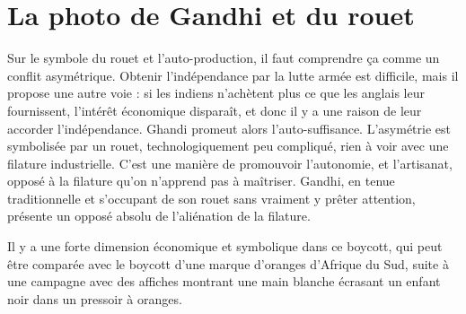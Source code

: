 \documentclass[a4paper,12pt]{book}
\begin{document}
\section{La photo de Gandhi et du rouet}
Sur le symbole du rouet et l'auto-production, il faut comprendre ça comme un conflit asymétrique. Obtenir l'indépendance par la lutte armée est difficile, mais il propose une autre voie : si les indiens n'achètent plus ce que les anglais leur fournissent, l'intérêt économique disparaît, et donc il y a une raison de leur accorder l'indépendance. Ghandi promeut alors l'auto-suffisance. L'asymétrie est symbolisée par un rouet, technologiquement peu compliqué, rien à voir avec une filature industrielle. C'est une manière de promouvoir l'autonomie, et l'artisanat, opposé à la filature qu'on n'apprend pas à maîtriser. Gandhi, en tenue traditionnelle et s'occupant de son rouet sans vraiment y prêter attention, présente un opposé absolu de l'aliénation de la filature.
\par Il y a une forte dimension économique et symbolique dans ce boycott, qui peut être comparée avec le boycott d'une marque d'oranges d'Afrique du Sud, suite à une campagne avec des affiches montrant une main blanche écrasant un enfant noir dans un pressoir à oranges. 
\end{document}
